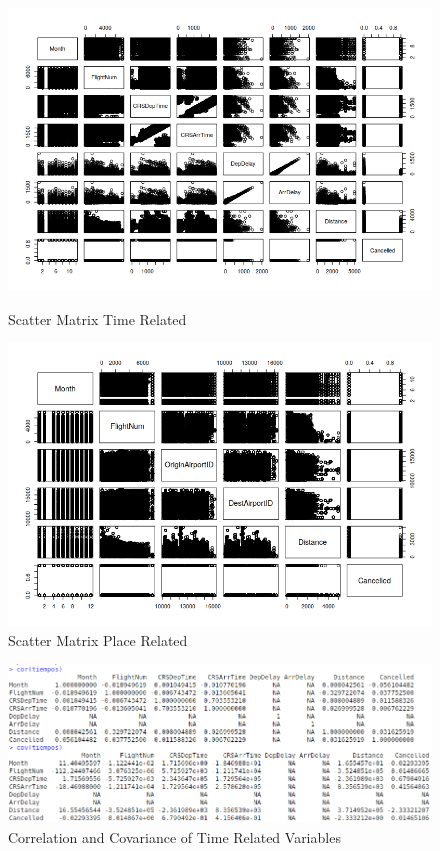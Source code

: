\documentclass{article}
\begin{document}
    \begin{figure}[H]
      \includegraphics[width=\linewidth]{r_plots/times_matrix.png}
      \caption{Scatter Matrix Time Related}
      \label{fig:graph1}
      \includegraphics[width=\linewidth]{r_plots/destinos_matrix.png}
      \caption{Scatter Matrix Place Related}
      \label{fig:graph1}
    \end{figure}



    \begin{figure}[H]
      \includegraphics[width=\linewidth]{r_plots/cor_cov_times.png}
      \caption{Correlation and Covariance of Time Related Variables}
      \label{fig:graph1}
    \end{figure}
\end{document}
